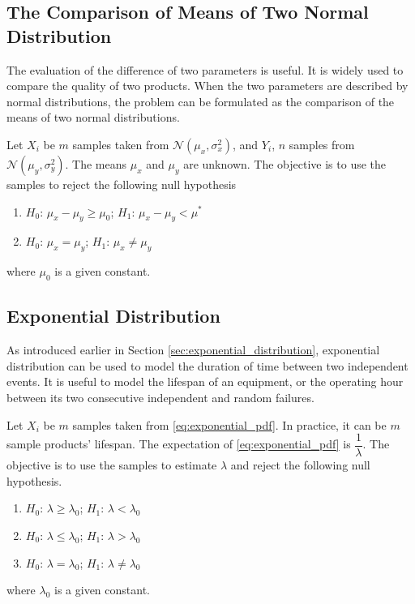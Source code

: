 \subsection{The Comparison of Means of Two Normal Distribution}

The evaluation of the difference of two parameters is useful. It is widely used to compare the quality of two products. When the two parameters are described by normal distributions, the problem can be formulated as the comparison of the means of two normal distributions.

Let $X_i$ be $m$ samples taken from $\mathcal{N}(\mu_x, \sigma_x^2)$, and $Y_i$, $n$ samples from $\mathcal{N}(\mu_y, \sigma_y^2)$. The means $\mu_x$ and $\mu_y$ are unknown. The objective is to use the samples to reject the following null hypothesis
\begin{enumerate}
	\item $H_0$: $\mu_x - \mu_y \geq \mu_0$; $H_1$: $\mu_x - \mu_y < \mu^*$
	\item $H_0$: $\mu_x = \mu_y$; $H_1$: $\mu_x \neq \mu_y$
\end{enumerate} 
where $\mu_0$ is a given constant.

\subsection{Exponential Distribution}

As introduced earlier in Section \ref{sec:exponential_distribution}, exponential distribution can be used to model the duration of time between two independent events. It is useful to model the lifespan of an equipment, or the operating hour between its two consecutive independent and random failures.

Let $X_i$ be $m$ samples taken from \eqref{eq:exponential_pdf}. In practice, it can be $m$ sample products' lifespan. The expectation of \eqref{eq:exponential_pdf} is $\dfrac{1}{\lambda}$. The objective is to use the samples to estimate $\lambda$ and reject the following null hypothesis.
\begin{enumerate}
	\item $H_0$: $\lambda \geq \lambda_0$; $H_1$: $\lambda < \lambda_0$
	\item $H_0$: $\lambda \leq \lambda_0$; $H_1$: $\lambda > \lambda_0$
	\item $H_0$: $\lambda = \lambda_0$; $H_1$: $\lambda \neq \lambda_0$
\end{enumerate}
where $\lambda_0$ is a given constant.

